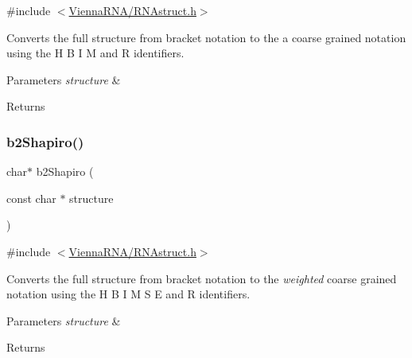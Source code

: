 {\ttfamily \#include $<$\hyperlink{RNAstruct_8h}{Vienna\+R\+N\+A/\+R\+N\+Astruct.\+h}$>$}



Converts the full structure from bracket notation to the a coarse grained notation using the \textquotesingle{}H\textquotesingle{} \textquotesingle{}B\textquotesingle{} \textquotesingle{}I\textquotesingle{} \textquotesingle{}M\textquotesingle{} and \textquotesingle{}R\textquotesingle{} identifiers. 


\begin{DoxyParams}{Parameters}
{\em structure} & \\
\hline
\end{DoxyParams}
\begin{DoxyReturn}{Returns}

\end{DoxyReturn}
\mbox{\label{group__struct__utils_ga5cd2feb367feeacad0c03cb7ddba5f10}} 
\subsubsection{\texorpdfstring{b2\+Shapiro()}{b2Shapiro()}}
{\footnotesize\ttfamily char$\ast$ b2\+Shapiro (\begin{DoxyParamCaption}\item[{const char $\ast$}]{structure }\end{DoxyParamCaption})}



{\ttfamily \#include $<$\hyperlink{RNAstruct_8h}{Vienna\+R\+N\+A/\+R\+N\+Astruct.\+h}$>$}



Converts the full structure from bracket notation to the {\itshape weighted} coarse grained notation using the \textquotesingle{}H\textquotesingle{} \textquotesingle{}B\textquotesingle{} \textquotesingle{}I\textquotesingle{} \textquotesingle{}M\textquotesingle{} \textquotesingle{}S\textquotesingle{} \textquotesingle{}E\textquotesingle{} and \textquotesingle{}R\textquotesingle{} identifiers. 


\begin{DoxyParams}{Parameters}
{\em structure} & \\
\hline
\end{DoxyParams}
\begin{DoxyReturn}{Returns}

\end{DoxyReturn}
\mbox{\label{group__struct__utils_ga880d33066dd95441e5fbb73c57ed1c3e}} 
